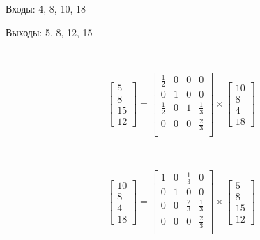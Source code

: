 \newpage
\thispagestyle{empty}
\mbox{}
\newpage

Входы: 4, 8, 10, 18

Выходы: 5, 8, 12, 15

\

$$
\left[
\begin{matrix}
	5 \\ 8 \\ 15 \\ 12
\end{matrix}
\right]
=
\left[
\begin{matrix}
	\frac12 & 0 & 0 & 0 \\
	0 		& 1 & 0 & 0 \\
	\frac12 & 0 & 1	& \frac13 \\
	0		& 0 & 0 & \frac23 \\
\end{matrix}
\right]
\times
\left[
\begin{matrix}
	10 \\ 8 \\ 4 \\ 18
\end{matrix}
\right]
$$

\

$$
\left[
\begin{matrix}
	10 \\ 8 \\ 4 \\ 18
\end{matrix}
\right]
=
\left[
\begin{matrix}
	1 & 0 & \frac13 & 0 \\
	0 & 1 & 0       & 0 \\
	0 & 0 & \frac23	& \frac13 \\
	0 & 0 & 0       & \frac23 \\
\end{matrix}
\right]
\times
\left[
\begin{matrix}
	5 \\ 8 \\ 15 \\ 12
\end{matrix}
\right]
$$

\

